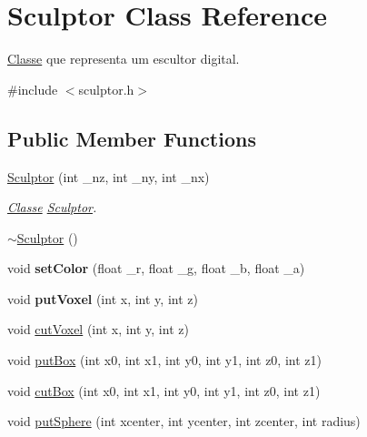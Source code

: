 \hypertarget{classSculptor}{}\section{Sculptor Class Reference}
\label{classSculptor}


\mbox{\hyperlink{classClasse}{Classe}} que representa um escultor digital.  




{\ttfamily \#include $<$sculptor.\+h$>$}

\subsection*{Public Member Functions}
\begin{DoxyCompactItemize}
\item 
\mbox{\hyperlink{classSculptor_ab03ab031a9cf17099569fbca9758fa0f}{Sculptor}} (int \+\_\+nz, int \+\_\+ny, int \+\_\+nx)
\begin{DoxyCompactList}\small\item\em \mbox{\hyperlink{classClasse}{Classe}} \mbox{\hyperlink{classSculptor}{Sculptor}}. \end{DoxyCompactList}\item 
\mbox{\hyperlink{classSculptor_a8f159bf97458326f16d2e238e11be7ff}{$\sim$\+Sculptor}} ()
\item 
\mbox{\label{classSculptor_a5723e671e073ac310b6f385a7fdc9f9f}} 
void {\bfseries set\+Color} (float \+\_\+r, float \+\_\+g, float \+\_\+b, float \+\_\+a)
\item 
\mbox{\label{classSculptor_a4bdea3048b419d58e93074060eaa7b52}} 
void {\bfseries put\+Voxel} (int x, int y, int z)
\item 
void \mbox{\hyperlink{classSculptor_ad9d714a35fc8ae16d06eb5df37c3493c}{cut\+Voxel}} (int x, int y, int z)
\item 
void \mbox{\hyperlink{classSculptor_a311ad7a0fb83fc67ac1f378be8e99fe1}{put\+Box}} (int x0, int x1, int y0, int y1, int z0, int z1)
\item 
void \mbox{\hyperlink{classSculptor_aa84a1b12b09e9e103fc8d78f8d1bc00f}{cut\+Box}} (int x0, int x1, int y0, int y1, int z0, int z1)
\item 
void \mbox{\hyperlink{classSculptor_a794a2b6ee8fc8098fd6150cb46101fc6}{put\+Sphere}} (int xcenter, int ycenter, int zcenter, int radius)
\item 

\end{DoxyCompactItemize}
